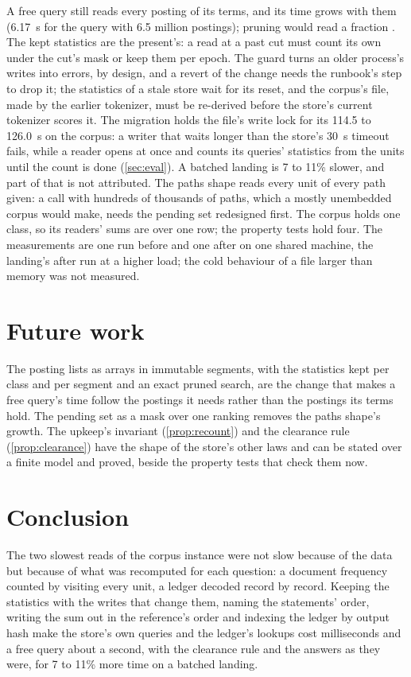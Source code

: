 \documentclass[11pt]{article}
\theoremstyle{plain}
\theoremstyle{definition}
\theoremstyle{remark}
\newcommand{\kwAfterMax}{6.17}
\newcommand{\migrationLex}{114.5 to 126.0}
\begin{document}
A free query still reads every posting of its terms, and its time grows with them (\kwAfterMax{}~s
for the query with 6.5 million postings); pruning would read a fraction \citep{turtle1995query}.
The kept statistics are the present's: a read at a past cut must count its own under the cut's mask
or keep them per epoch. The guard turns an older process's writes into errors, by design, and a
revert of the change needs the runbook's step to drop it; the statistics of a stale store wait for
its reset, and the corpus's file, made by the earlier tokenizer, must be re-derived before the
store's current tokenizer scores it. The migration holds the file's write lock for its
\migrationLex{}~s on the corpus: a writer that waits longer than the store's 30~s timeout fails,
while a reader opens at once and counts its queries' statistics from the units until the count is
done (\cref{sec:eval}). A batched landing is 7 to 11\% slower, and part of that is not attributed.
The paths shape reads every unit of every path given: a call with hundreds of thousands of paths,
which a mostly unembedded corpus would make, needs the pending set redesigned first. The corpus
holds one class, so its readers' sums are over one row; the property tests hold four. The
measurements are one run before and one after on one shared machine, the landing's after run at a
higher load; the cold behaviour of a file larger than memory was not measured.

\section{Future work}\label{sec:future}

The posting lists as arrays in immutable segments, with the statistics kept per class and per
segment and an exact pruned search, are the change that makes a free query's time follow the
postings it needs rather than the postings its terms hold. The pending set as a mask over one
ranking removes the paths shape's growth. The upkeep's invariant (\cref{prop:recount}) and the
clearance rule (\cref{prop:clearance}) have the shape of the store's other laws and can be stated
over a finite model and proved, beside the property tests that check them now.

\section{Conclusion}\label{sec:conclusion}

The two slowest reads of the corpus instance were not slow because of the data but because of
what was recomputed for each question: a document frequency counted by visiting every unit, a
ledger decoded record by record. Keeping the statistics with the writes that change them, naming
the statements' order, writing the sum out in the reference's order and indexing the ledger by
output hash make the store's own queries and the ledger's lookups cost milliseconds and a free
query about a second, with the clearance rule and the answers as they were, for 7 to 11\% more
time on a batched landing.



\end{document}
